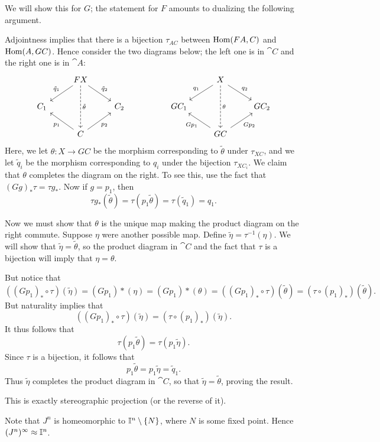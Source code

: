 \documentclass[../../solutions.tex]{subfiles}
\begin{document}
\begin{exercise} \leavevmode
We will show this for $G$; the statement for $F$ amounts to dualizing the following argument.

Adjointness implies that there is a bijection $\tau_{AC}$ between $\operatorname{Hom}(FA,C)$ and $\operatorname{Hom}(A,GC)$.
Hence consider the two diagrams below; the left one is in $\cat C$ and the right one is in $\cat A$:
\[
\begin{tikzcd}
& FX\ar[dl,"\tilde q_1",swap]\ar[dd,dashed,"\tilde\theta"]\ar[dr,"\tilde q_2"] & & & & X\ar[dl,"q_1",swap]\ar[dd,dashed,"\theta"]\ar[dr,"q_2"] & \\
C_1 & & C_2 & & GC_1 & & GC_2 \\
& C\ar[ul,"p_1"]\ar[ur,"p_2",swap] & & & & GC\ar[ul,"Gp_1"]\ar[ur,"Gp_2",swap] &
\end{tikzcd}
\]
Here, we let $\theta:X\to GC$ be the morphism corresponding to $\tilde\theta$ under $\tau_{XC}$, and we let $\tilde q_i$ be the morphism corresponding to $q_i$ under the bijection $\tau_{XC_i}$.
We claim that $\theta$ completes the diagram on the right.
To see this, use the fact that $(Gg)_*\tau=\tau g_*$.
Now if $g=p_1$, then
\[\tau g_*(\tilde\theta)=\tau(p_1\tilde\theta)=\tau(\tilde q_1)=q_1.\]

Now we must show that $\theta$ is the unique map making the product diagram on the right commute.
Suppose $\eta$ were another possible map.
Define $\tilde\eta=\tau^{-1}(\eta)$.
We will show that $\tilde\eta=\tilde\theta$, so the product diagram in $\cat C$ and the fact that $\tau$ is a bijection will imply that $\eta=\theta$.

But notice that
\[((Gp_1)_*\circ\tau)(\tilde\eta)=(Gp_1)*(\eta)=(Gp_1)*(\theta)=((Gp_1)_*\circ\tau)(\tilde\theta)=(\tau\circ(p_1)_*)(\tilde\theta).\]
But naturality implies that
\[((Gp_1)_*\circ\tau)(\tilde\eta)=(\tau\circ(p_1)_*)(\tilde\eta).\]
It thus follows that
\[\tau(p_1\tilde\theta)=\tau(p_1\tilde\eta).\]
Since $\tau$ is a bijection, it follows that
\[p_1\tilde\theta=p_1\tilde\eta=\tilde q_1.\]
Thus $\tilde\eta$ completes the product diagram in $\cat C$, so that $\tilde\eta=\tilde\theta$, proving the result.
\end{exercise}

\begin{exercise} \leavevmode
This is exactly stereographic projection (or the reverse of it).
\end{exercise}

\begin{exercise} \leavevmode
Note that $J^n$ is homeomorphic to $\mathbb I^n\setminus\{N\}$, where $N$ is some fixed point.
Hence $(J^n)^\infty\approx\mathbb I^n$.
\end{exercise}
\end{document}
